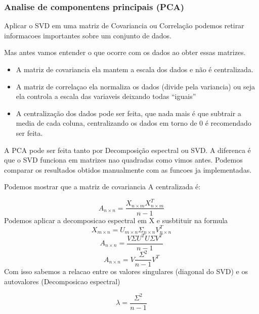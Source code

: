 \documentclass[
]{article}
\begin{document}
\hypertarget{analise-de-componentens-principais-pca}{%
\subsubsection{Analise de componentens principais
(PCA)}\label{analise-de-componentens-principais-pca}}

Aplicar o SVD em uma matriz de Covariancia ou Correlação podemos retirar
informacoes importantes sobre um conjunto de dados.

Mas antes vamos entender o que ocorre com os dados ao obter essas
matrizes.

\begin{itemize}
\item
  A matriz de covariancia ela mantem a escala dos dados e não é
  centralizada.
\item
  A matriz de correlaçao ela normaliza os dados (divide pela variancia)
  ou seja ela controla a escala das variaveis deixando todas ``iguais''
\item
  A centralização dos dados pode ser feita, que nada mais é que subtrair
  a media de cada coluna, centralizando os dados em torno de 0 é
  recomendado ser feita.
\end{itemize}

A PCA pode ser feita tanto por Decomposição espectral ou SVD. A
diferenca é que o SVD funciona em matrizes nao quadradas como vimos
antes. Podemos comparar os resultados obtidos manualmente com as funcoes
ja implementadas.

Podemos mostrar que a matriz de covariancia A centralizada é:

\[
A_{n \times n} = \frac{X_{n \times m}  X_{n \times m}^{T}}{n-1}
\] Podemos aplicar a decomposicao espectral em X e susbtituir na formula
\[
X_{m \times n} = U_{m \times n} \Sigma_{n \times n} V^{T}_{n \times n}
\] \[
A_{n \times n} = \frac{V \Sigma U^{T} U \Sigma V^{T}}{n-1}
\] \[
A_{n \times n} = V\frac{\Sigma^2 }{n-1}V^{T}
\] Com isso sabemos a relacao entre os valores singulares (diagonal do
SVD) e os autovalores (Decomposicao espectral)

\[
\lambda = \frac{\Sigma^2 }{n-1}
\]
\end{document}
